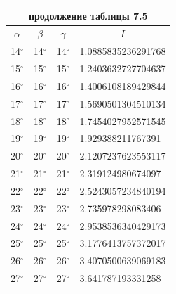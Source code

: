 \documentclass[14pt]{extreport}
\begin{document}
\begin{center}
   \begin{tabular}{ |l|l|l|l| }
   \hline
    \multicolumn{4}{|c|}{продолжение таблицы 7.5}\\ \hline
    \multicolumn{1}{|c|}{$\alpha$} & \multicolumn{1}{c|}{$\beta$} & \multicolumn{1}{c|}{$\gamma$} & \multicolumn{1}{c|}{$I$} \\ \hline
    14$^{\circ}$  & 14$^{\circ}$  & 14$^{\circ}$  &1.0885835236291768    \\ \hline
    15$^{\circ}$  & 15$^{\circ}$  & 15$^{\circ}$  &1.2403632727704637    \\ \hline
    16$^{\circ}$  & 16$^{\circ}$  & 16$^{\circ}$  &1.4006108189429844    \\ \hline
    17$^{\circ}$  & 17$^{\circ}$  & 17$^{\circ}$  &1.5690501304510134    \\ \hline
    18$^{\circ}$  & 18$^{\circ}$  & 18$^{\circ}$  &1.7454027952571545    \\ \hline
    19$^{\circ}$  & 19$^{\circ}$  & 19$^{\circ}$  &1.929388211767391    \\ \hline
    20$^{\circ}$  & 20$^{\circ}$  & 20$^{\circ}$  &2.1207237623553117    \\ \hline
    21$^{\circ}$  & 21$^{\circ}$  & 21$^{\circ}$  &2.319124980674097    \\ \hline
    22$^{\circ}$  & 22$^{\circ}$  & 22$^{\circ}$  &2.5243057234840194    \\ \hline
    23$^{\circ}$  & 23$^{\circ}$  & 23$^{\circ}$  &2.735978298083406    \\ \hline
    24$^{\circ}$  & 24$^{\circ}$  & 24$^{\circ}$  &2.9538536340429173    \\ \hline
    25$^{\circ}$  & 25$^{\circ}$  & 25$^{\circ}$  &3.1776413757372017    \\ \hline
    26$^{\circ}$  & 26$^{\circ}$  & 26$^{\circ}$  &3.4070500639069183    \\ \hline
    27$^{\circ}$  & 27$^{\circ}$  & 27$^{\circ}$  &3.641787193331258    \\ \hline
    \end{tabular}             
\end{center}
\end{document}
